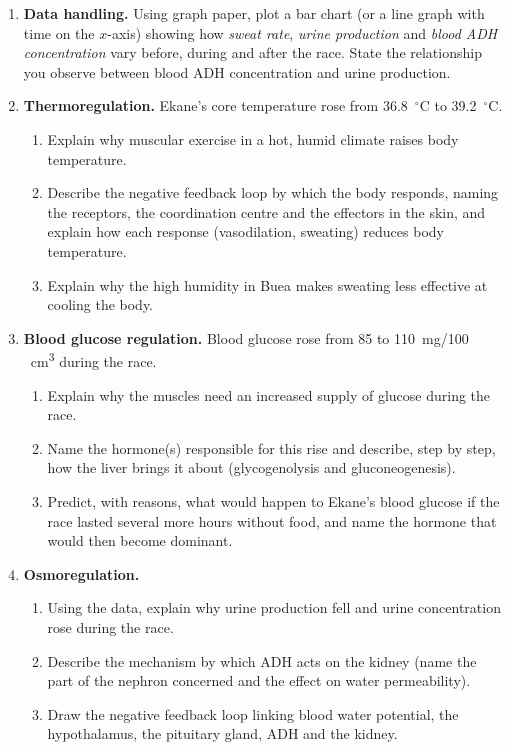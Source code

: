 \documentclass[11pt]{article}
\newcommand{\cle}[1]{{\popxbold\color{popdark}#1}}
\begin{document}
\begin{enumerate}
\item \textbf{Data handling.} Using graph paper, plot a bar chart (or a line graph with time on the $x$-axis) showing how \emph{sweat rate}, \emph{urine production} and \emph{blood ADH concentration} vary before, during and after the race. State the relationship you observe between blood ADH concentration and urine production.

\item \textbf{Thermoregulation.} Ekane's core temperature rose from \SI{36.8}{\ensuremath{{}^{\circ}\mathrm{C}}} to \SI{39.2}{\ensuremath{{}^{\circ}\mathrm{C}}}. 
\begin{enumerate}
\item Explain why muscular exercise in a hot, humid climate raises body temperature.
\item Describe the \cle{negative feedback loop} by which the body responds, naming the \cle{receptors}, the \cle{coordination centre} and the \cle{effectors} in the skin, and explain how each response (vasodilation, sweating) reduces body temperature.
\item Explain why the high humidity in Buea makes sweating less effective at cooling the body.
\end{enumerate}

\item \textbf{Blood glucose regulation.} Blood glucose rose from 85 to \SI{110}{mg/100\,cm^{3}} during the race.
\begin{enumerate}
\item Explain why the muscles need an increased supply of glucose during the race.
\item Name the hormone(s) responsible for this rise and describe, step by step, how the \cle{liver} brings it about (glycogenolysis and gluconeogenesis).
\item Predict, with reasons, what would happen to Ekane's blood glucose if the race lasted several more hours without food, and name the hormone that would then become dominant.
\end{enumerate}

\item \textbf{Osmoregulation.} 
\begin{enumerate}
\item Using the data, explain why urine production fell and urine concentration rose during the race.
\item Describe the mechanism by which \cle{ADH} acts on the kidney (name the part of the nephron concerned and the effect on water permeability).
\item Draw the negative feedback loop linking blood water potential, the hypothalamus, the pituitary gland, ADH and the kidney.
\end{enumerate}


\end{enumerate}
\end{document}

